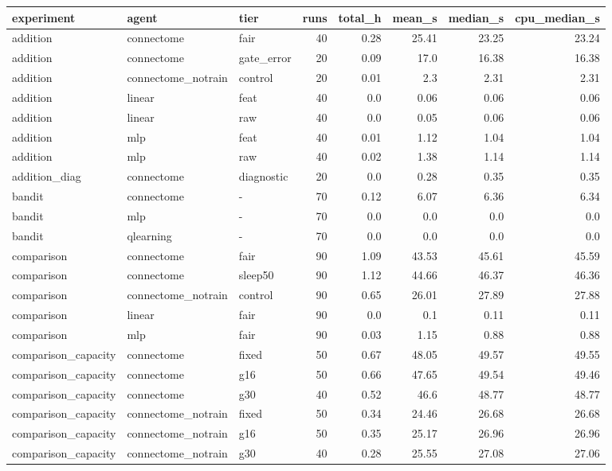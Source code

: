 \begin{table}[t]
\centering
\small
\begin{tabular}{lllrrrrr}
\toprule
experiment & agent & tier & runs & total\_h & mean\_s & median\_s & cpu\_median\_s \\
\midrule
addition & connectome & fair & 40 & 0.28 & 25.41 & 23.25 & 23.24 \\
addition & connectome & gate\_error & 20 & 0.09 & 17.0 & 16.38 & 16.38 \\
addition & connectome\_notrain & control & 20 & 0.01 & 2.3 & 2.31 & 2.31 \\
addition & linear & feat & 40 & 0.0 & 0.06 & 0.06 & 0.06 \\
addition & linear & raw & 40 & 0.0 & 0.05 & 0.06 & 0.06 \\
addition & mlp & feat & 40 & 0.01 & 1.12 & 1.04 & 1.04 \\
addition & mlp & raw & 40 & 0.02 & 1.38 & 1.14 & 1.14 \\
addition\_diag & connectome & diagnostic & 20 & 0.0 & 0.28 & 0.35 & 0.35 \\
bandit & connectome & - & 70 & 0.12 & 6.07 & 6.36 & 6.34 \\
bandit & mlp & - & 70 & 0.0 & 0.0 & 0.0 & 0.0 \\
bandit & qlearning & - & 70 & 0.0 & 0.0 & 0.0 & 0.0 \\
comparison & connectome & fair & 90 & 1.09 & 43.53 & 45.61 & 45.59 \\
comparison & connectome & sleep50 & 90 & 1.12 & 44.66 & 46.37 & 46.36 \\
comparison & connectome\_notrain & control & 90 & 0.65 & 26.01 & 27.89 & 27.88 \\
comparison & linear & fair & 90 & 0.0 & 0.1 & 0.11 & 0.11 \\
comparison & mlp & fair & 90 & 0.03 & 1.15 & 0.88 & 0.88 \\
comparison\_capacity & connectome & fixed & 50 & 0.67 & 48.05 & 49.57 & 49.55 \\
comparison\_capacity & connectome & g16 & 50 & 0.66 & 47.65 & 49.54 & 49.46 \\
comparison\_capacity & connectome & g30 & 40 & 0.52 & 46.6 & 48.77 & 48.77 \\
comparison\_capacity & connectome\_notrain & fixed & 50 & 0.34 & 24.46 & 26.68 & 26.68 \\
comparison\_capacity & connectome\_notrain & g16 & 50 & 0.35 & 25.17 & 26.96 & 26.96 \\
comparison\_capacity & connectome\_notrain & g30 & 40 & 0.28 & 25.55 & 27.08 & 27.06 \\

\end{tabular}
\end{table}
